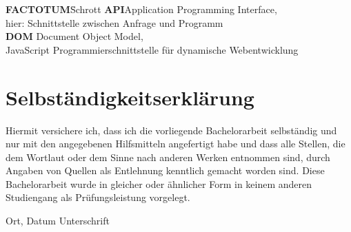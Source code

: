 \documentclass[twoside,12pt,a4paper]{report}
\begin{document}
\begin{tabbing}
\textbf{FACTOTUM}\=Schrott\kill
\textbf{API}\>Application Programming Interface,\\ 
\textbf{}\>hier: Schnittstelle zwischen Anfrage und Programm\\
\textbf{DOM} \> Document Object Model, \\
\textbf{} \> JavaScript Programmierschnittstelle für dynamische Webentwicklung\\
\end{tabbing}

\cleardoublepage


\setcounter{page}{1}

%
\cleardoublepage

%
\cleardoublepage


%
\cleardoublepage

%    
\cleardoublepage







\cleardoublepage

\thispagestyle{empty}
\section*{Selbst\"andigkeitserkl\"arung}

Hiermit versichere ich, dass ich die vorliegende Bachelorarbeit 
selbst\"andig und nur mit den angegebenen Hilfsmitteln angefertigt habe und dass alle Stellen, die dem Wortlaut oder dem 
Sinne nach anderen Werken entnommen sind, durch Angaben von Quellen als 
Entlehnung kenntlich gemacht worden sind. 
Diese Bachelorarbeit wurde in gleicher oder \"ahnlicher Form in keinem anderen 
Studiengang als Pr\"ufungsleistung vorgelegt. 

\vskip 3cm

Ort, Datum  \hfill Unterschrift \hfill 
\end{document}
